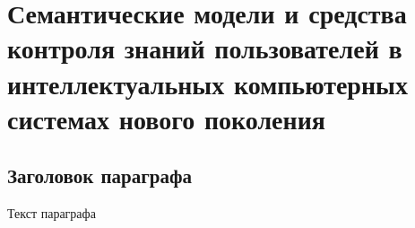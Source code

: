 
\chapter{Семантические модели и средства контроля знаний пользователей в интеллектуальных компьютерных системах нового поколения}
\label{chapter_knowledge_control}


\section{Заголовок параграфа}
Текст параграфа

%
